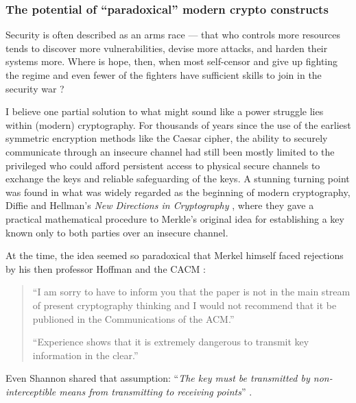 \documentclass[10pt]{article}
\begin{document}
\subsubsection{The potential of ``paradoxical'' modern crypto constructs}
Security is often described as an arms race --- that who controls more
resources tends to discover more vulnerabilities, devise more attacks, and
harden their systems more. Where is hope, then, when most self-censor and give
up fighting the regime \cite{self.censor.1, self.censor.2, self.censor.3}  and
even fewer of the fighters have sufficient skills to join in the security war
\cite{defenders.lack.skills.1, defenders.lack.skills.2}?

I believe one partial solution to what might sound like a power struggle lies
within (modern) cryptography. For thousands of years since the use of the
earliest symmetric encryption methods like the Caesar cipher, the ability to
securely communicate through an insecure channel had still been mostly limited
to the privileged who could afford persistent access to physical secure
channels to exchange the keys and reliable safeguarding of the keys.  A
stunning turning point was found in what was widely regarded as the beginning
of modern cryptography, Diffie and Hellman's \emph{New Directions in
Cryptography} \cite{new.directions.crypto}, where they gave a practical
mathematical procedure to Merkle's original idea for establishing a key known
only to both parties over an insecure channel.

At the time, the idea seemed so paradoxical that Merkel himself faced 
rejections by his then professor Hoffman and the
CACM \cite{merkle.rejection}:
\begin{quotation}
	``I am sorry to have to inform you that the paper is not in the main stream
	of present cryptography thinking and I would not recommend that it be
	publioned in the Communications of the ACM.''

	``Experience shows that it is extremely dangerous to transmit key
	information in the clear.''\cite{merkle.rejection}
\end{quotation}
Even Shannon shared that assumption: ``\emph{The key must be transmitted by
non-interceptible means from transmitting to receiving points}''
\cite[p.~670]{shannon.theory.secrecy}.
\end{document}
